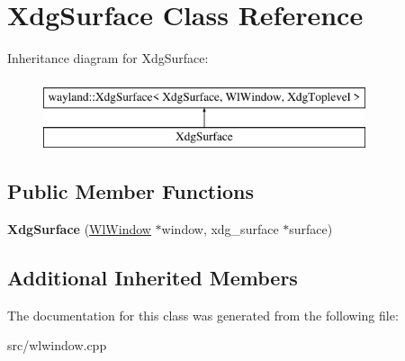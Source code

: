 \hypertarget{classXdgSurface}{}\section{Xdg\+Surface Class Reference}
\label{classXdgSurface}
Inheritance diagram for Xdg\+Surface\+:\begin{figure}[H]
\begin{center}
\leavevmode
\includegraphics[height=2.000000cm]{classXdgSurface}
\end{center}
\end{figure}
\subsection*{Public Member Functions}
\begin{DoxyCompactItemize}
\item 
\mbox{\label{classXdgSurface_a85f83ceb0ab85eefeea180b959cefeea}} 
{\bfseries Xdg\+Surface} (\mbox{\hyperlink{classWlWindow}{Wl\+Window}} $\ast$window, xdg\+\_\+surface $\ast$surface)
\end{DoxyCompactItemize}
\subsection*{Additional Inherited Members}


The documentation for this class was generated from the following file\+:\begin{DoxyCompactItemize}
\item 
src/wlwindow.\+cpp\end{DoxyCompactItemize}
